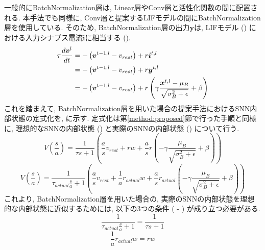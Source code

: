 一般的にBatchNormalization層は, Linear層やConv層と活性化関数の間に配置される.
本手法でも同様に, Conv層と提案するLIFモデルの間にBatchNormalization層を使用している.
そのため, BatchNormalization層の出力$\bm{y}$は, LIFモデル () における入力シナプス電流$\bm{i}$に相当する ().
\begin{align}
    {\tau}\frac{d\bm{v}^l}{dt}&=-\left(\bm{v}^{t-1,l}-v_{rest}\right)+r\bm{i}^{t, l} \notag \\
    &=-\left(\bm{v}^{t-1,l}-v_{rest}\right)+r\bm{y}^{t, l} \notag \\
    &=-\left(\bm{v}^{t-1,l}-v_{rest}\right)+r\left(\gamma \frac{\bm{x}^{t,l}-\mu_B}{\sqrt{\sigma_B^2+\epsilon}} +\beta\right)
    \label{eq:batchnormalization:lif}
\end{align}
これを踏まえて, BatchNormalization層を用いた場合の提案手法におけるSNN内部状態の定式化を, に示す.
定式化は第\ref{method:proposed}節で行った手順と同様に, 理想的なSNNの内部状態 () と実際のSNNの内部状態 () について行う.
\begin{equation}
    V\left(\frac{s}{a}\right) =  \frac{1}{\tau s +1}\left( 
        \frac{a}{s} v_{rest} +rw 
        + \frac{a}{s}r \left(-\gamma \frac{\mu_B}{\sqrt{\sigma_B^2+\epsilon}} +\beta\right)   
    \right)
    \label{eq:batchnormalization:lif:ideal}
\end{equation}
\begin{equation}
    V\left(\frac{s}{a}\right) =  \frac{1}{\tau_{actual} \frac{s}{a} +1}\left( 
        \frac{a}{s} v_{rest} +\frac{1}{a} r_{actual} w
        + \frac{a}{s} r_{actual} \left(-\gamma \frac{\mu_B}{\sqrt{\sigma_B^2+\epsilon}} +\beta\right) 
    \right) 
    \label{eq:batchnormalization:lif:actual}
\end{equation}
これより, BatchNormalization層を用いた場合の, 実際のSNNの内部状態を理想的な内部状態に近似するためには, 以下の3つの条件 ( - ) が成り立つ必要がある.
\begin{equation}
    \frac{1}{\tau_{actual} \frac{s}{a} +1} = \frac{1}{\tau s +1}  
    \label{eq:batchnormalization:lif:approximation:condition1}
\end{equation}
\begin{equation}
    \frac{1}{a} r_{actual} w  = r w  
    \label{eq:batchnormalization:lif:approximation:condition2}
\end{equation}
